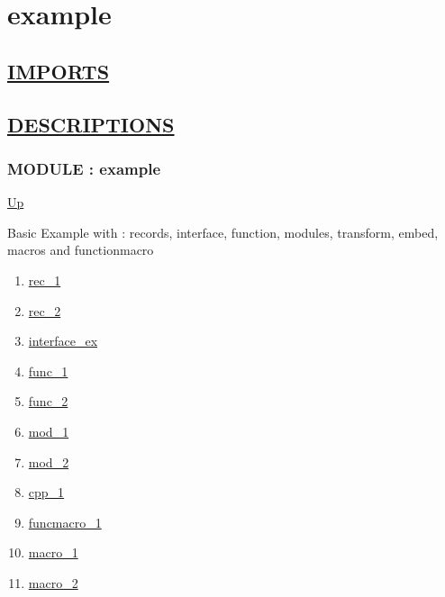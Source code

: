 \chapter*{example}
\hypertarget{ecldoc:toc:example}{}

\section*{\underline{IMPORTS}}

\section*{\underline{DESCRIPTIONS}}
\subsection*{MODULE : example}
\hypertarget{ecldoc:example}{}
\par
\begin{minipage}[t]{\textwidth}
\begin{flushleft}
  
\end{flushleft}
\end{minipage}
\hyperlink{ecldoc:toc:root}{Up} \\
\par
Basic Example with : records, interface, function, modules, transform, embed, macros and functionmacro \\
\par
\begin{enumerate}
\item \hyperlink{ecldoc:example.rec_1}{rec\_1}
\item \hyperlink{ecldoc:example.rec_2}{rec\_2}
\item \hyperlink{ecldoc:example.interface_ex}{interface\_ex}
\item \hyperlink{ecldoc:example.func_1}{func\_1}
\item \hyperlink{ecldoc:example.func_2}{func\_2}
\item \hyperlink{ecldoc:example.mod_1}{mod\_1}
\item \hyperlink{ecldoc:example.mod_2}{mod\_2}
\item \hyperlink{ecldoc:example.cpp_1}{cpp\_1}
\item \hyperlink{ecldoc:example.funcmacro_1}{funcmacro\_1}
\item \hyperlink{ecldoc:example.macro_1}{macro\_1}
\item \hyperlink{ecldoc:example.macro_2}{macro\_2}
\end{enumerate}
